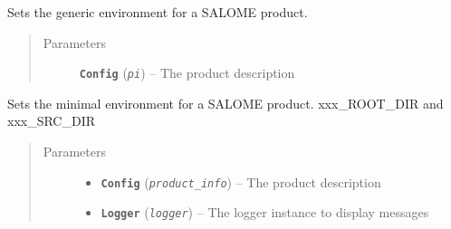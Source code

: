 \documentclass[a4paper,10pt,english]{sphinxmanual}
\begin{document}
\begin{fulllineitems}
\begin{fulllineitems}
\end{fulllineitems}


\begin{fulllineitems}
\label{commands/apidoc/src:src.environment.SalomeEnviron.set_salome_generic_product_env}
Sets the generic environment for a SALOME product.
\begin{quote}\begin{description}
\item[{Parameters}] \leavevmode
\textbf{\texttt{Config}} (\emph{\texttt{pi}}) -- The product description

\end{description}\end{quote}

\end{fulllineitems}


\begin{fulllineitems}
\label{commands/apidoc/src:src.environment.SalomeEnviron.set_salome_minimal_product_env}
Sets the minimal environment for a SALOME product.
xxx\_ROOT\_DIR and xxx\_SRC\_DIR
\begin{quote}\begin{description}
\item[{Parameters}] \leavevmode\begin{itemize}
\item {} 
\textbf{\texttt{Config}} (\emph{\texttt{product\_info}}) -- The product description

\item {} 
\textbf{\texttt{Logger}} (\emph{\texttt{logger}}) -- The logger instance to display messages

\end{itemize}

\end{description}\end{quote}

\end{fulllineitems}


\end{fulllineitems}
\end{document}
